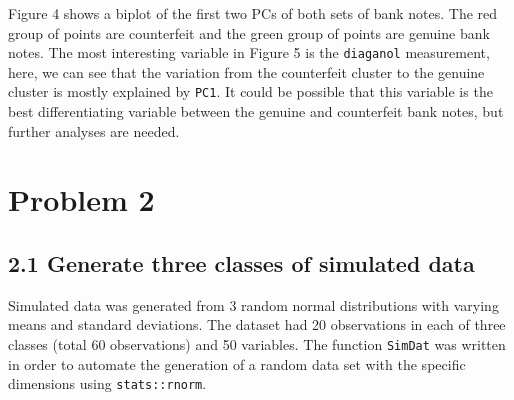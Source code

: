\documentclass[]{article}
\newenvironment{Shaded}{\begin{snugshade}}{\end{snugshade}}
\newcommand{\KeywordTok}[1]{\textcolor[rgb]{0.13,0.29,0.53}{\textbf{{#1}}}}
\newcommand{\DataTypeTok}[1]{\textcolor[rgb]{0.13,0.29,0.53}{{#1}}}
\newcommand{\DecValTok}[1]{\textcolor[rgb]{0.00,0.00,0.81}{{#1}}}
\newcommand{\StringTok}[1]{\textcolor[rgb]{0.31,0.60,0.02}{{#1}}}
\newcommand{\CommentTok}[1]{\textcolor[rgb]{0.56,0.35,0.01}{\textit{{#1}}}}
\newcommand{\OtherTok}[1]{\textcolor[rgb]{0.56,0.35,0.01}{{#1}}}
\newcommand{\NormalTok}[1]{{#1}}
\begin{document}
Figure 4 shows a biplot of the first two PCs of both sets of bank notes.
The red group of points are counterfeit and the green group of points
are genuine bank notes. The most interesting variable in Figure 5 is the
\texttt{diaganol} measurement, here, we can see that the variation from
the counterfeit cluster to the genuine cluster is mostly explained by
\texttt{PC1}. It could be possible that this variable is the best
differentiating variable between the genuine and counterfeit bank notes,
but further analyses are needed.

\section{Problem 2}\label{problem-2}

\subsection{2.1 Generate three classes of simulated
data}\label{generate-three-classes-of-simulated-data}

Simulated data was generated from 3 random normal distributions with
varying means and standard deviations. The dataset had 20 observations
in each of three classes (total 60 observations) and 50 variables. The
function \texttt{SimDat} was written in order to automate the generation
of a random data set with the specific dimensions using
\texttt{stats::rnorm}.

\begin{Shaded}
\end{Shaded}
\end{document}
